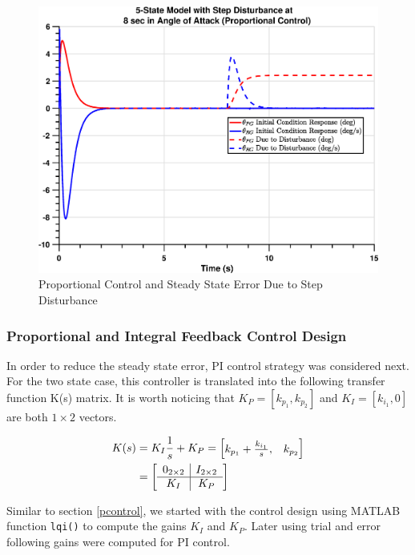 \documentclass[12pt]{article}
\begin{document}
	\begin{figure}[!h]
		\centering
		\includegraphics[width=0.8\linewidth]{disturbanceRejectionPControl}
		\caption{Proportional Control and Steady State Error Due to Step Disturbance}
		\label{fig:disturbancerejectionpcontrol}
	\end{figure}
	
	\subsubsection{Proportional and Integral Feedback Control Design}
	In order to reduce the steady state error, PI control strategy was considered next. For the two state case, this controller is translated into the following transfer function K(s) matrix. It is worth noticing that $K_P = [k_{p_1}, k_{p_2}]$ and $K_I = [k_{i_1}, 0]$ are both $1 \times 2$ vectors.
	
	\begin{equation}
	\label{eq19}
	\begin{split}
	K(s) &= 
	K_I \frac{1}{s} + K_P = \begin{bmatrix}
	k_{p_1} + \frac{k_{i_1}}{s}, & k_{p_2}
	\end{bmatrix}\\
	&=
	\left[
	\begin{array}{c | c}
	0_{2 \times 2}  & I_{2 \times 2} \\ \hline
	K_I & K_P
	\end{array}\right] \\
	\end{split}
	\end{equation}
	
	\noindent Similar to section \ref{pcontrol}, we started with the control design using MATLAB function \texttt{lqi()} to compute the gains $K_I$ and $K_P$. Later using trial and error following gains were computed for PI control.
	
\end{document}
